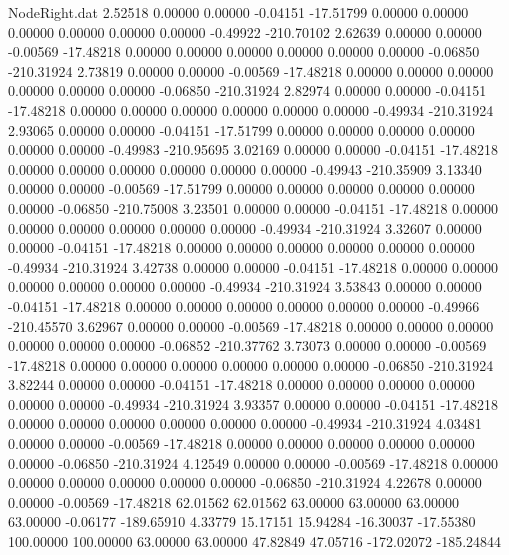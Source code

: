 \begin{filecontents}{NodeRight.dat}
   2.52518    0.00000    0.00000    -0.04151  -17.51799    0.00000    0.00000    0.00000    0.00000    0.00000    0.00000   -0.49922 -210.70102
   2.62639    0.00000    0.00000    -0.00569  -17.48218    0.00000    0.00000    0.00000    0.00000    0.00000    0.00000   -0.06850 -210.31924
   2.73819    0.00000    0.00000    -0.00569  -17.48218    0.00000    0.00000    0.00000    0.00000    0.00000    0.00000   -0.06850 -210.31924
   2.82974    0.00000    0.00000    -0.04151  -17.48218    0.00000    0.00000    0.00000    0.00000    0.00000    0.00000   -0.49934 -210.31924
   2.93065    0.00000    0.00000    -0.04151  -17.51799    0.00000    0.00000    0.00000    0.00000    0.00000    0.00000   -0.49983 -210.95695
   3.02169    0.00000    0.00000    -0.04151  -17.48218    0.00000    0.00000    0.00000    0.00000    0.00000    0.00000   -0.49943 -210.35909
   3.13340    0.00000    0.00000    -0.00569  -17.51799    0.00000    0.00000    0.00000    0.00000    0.00000    0.00000   -0.06850 -210.75008
   3.23501    0.00000    0.00000    -0.04151  -17.48218    0.00000    0.00000    0.00000    0.00000    0.00000    0.00000   -0.49934 -210.31924
   3.32607    0.00000    0.00000    -0.04151  -17.48218    0.00000    0.00000    0.00000    0.00000    0.00000    0.00000   -0.49934 -210.31924
   3.42738    0.00000    0.00000    -0.04151  -17.48218    0.00000    0.00000    0.00000    0.00000    0.00000    0.00000   -0.49934 -210.31924
   3.53843    0.00000    0.00000    -0.04151  -17.48218    0.00000    0.00000    0.00000    0.00000    0.00000    0.00000   -0.49966 -210.45570
   3.62967    0.00000    0.00000    -0.00569  -17.48218    0.00000    0.00000    0.00000    0.00000    0.00000    0.00000   -0.06852 -210.37762
   3.73073    0.00000    0.00000    -0.00569  -17.48218    0.00000    0.00000    0.00000    0.00000    0.00000    0.00000   -0.06850 -210.31924
   3.82244    0.00000    0.00000    -0.04151  -17.48218    0.00000    0.00000    0.00000    0.00000    0.00000    0.00000   -0.49934 -210.31924
   3.93357    0.00000    0.00000    -0.04151  -17.48218    0.00000    0.00000    0.00000    0.00000    0.00000    0.00000   -0.49934 -210.31924
   4.03481    0.00000    0.00000    -0.00569  -17.48218    0.00000    0.00000    0.00000    0.00000    0.00000    0.00000   -0.06850 -210.31924
   4.12549    0.00000    0.00000    -0.00569  -17.48218    0.00000    0.00000    0.00000    0.00000    0.00000    0.00000   -0.06850 -210.31924
   4.22678    0.00000    0.00000    -0.00569  -17.48218   62.01562   62.01562   63.00000   63.00000   63.00000   63.00000   -0.06177 -189.65910
   4.33779   15.17151   15.94284   -16.30037  -17.55380  100.00000  100.00000   63.00000   63.00000   47.82849   47.05716 -172.02072 -185.24844

\end{filecontents}

